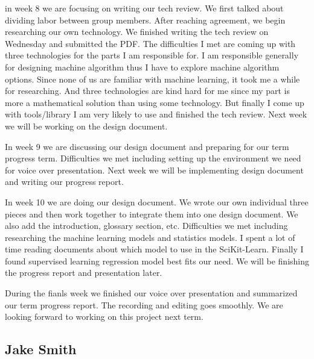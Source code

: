 \documentclass[letterpaper, 10pt,titlepage]{article}
\begin{document}
\par in week 8 we are focusing on writing our tech review. We first talked about dividing labor between group members. After reaching agreement, we begin researching our own technology. We finished writing the tech review on Wednesday and submitted the PDF. The difficulties I met are coming up with three technologies for the parts I am responsible for. I am responsible generally for designing machine algorithm thus I have to explore machine algorithm options. Since none of us are familiar with machine learning, it took me a while for researching. And three technologies are kind hard for me since my part is more a mathematical solution than using some technology. But finally I come up with tools/library I am very likely to use and finished the tech review. Next week we will be working on the design document.

\par In week 9 we are discussing our design document and preparing for our term progress term. Difficulties we met including setting up the environment we need for voice over presentation. Next week we will be implementing design document and writing our progress report.

\par In week 10 we are doing our design document. We wrote our own individual three pieces and then work together to integrate them into one design document. We also add the introduction, glossary section, etc. Difficulties we met including researching the machine learning models and statistics models. I spent a lot of time reading documents about which model to use in the SciKit-Learn. Finally I found supervised learning regression model best fits our need. We will be finishing the progress report and presentation later.

\par During the fianls week we finished our voice over presentation and summarized our term progress report. The recording and editing goes smoothly. We are looking forward to working on this project next term.

\subsection{Jake Smith}
\end{document}
